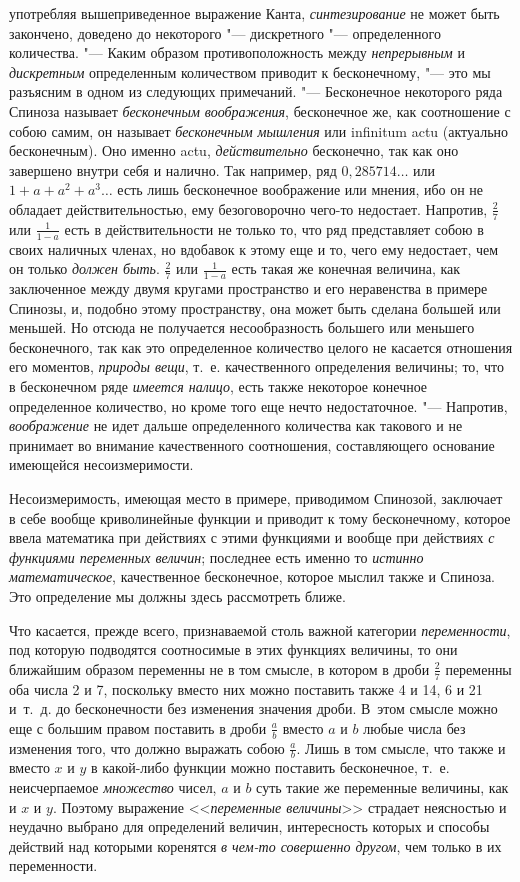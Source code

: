 употребляя вышеприведенное выражение Канта,
{\em синтезирование} не может быть закончено, доведено
до некоторого "--- дискретного "--- определенного количества. "--- Каким образом
противоположность между {\em непрерывным} и
{\em дискретным} определенным количеством приводит к
бесконечному, "--- это мы разъясним в одном из следующих примечаний. "---
Бесконечное некоторого ряда Спиноза называет
{\em бесконечным воображения}, бесконечное же, как
соотношение с собою самим, он называет {\em бесконечным
мышления} или infinitum actu (актуально бесконечным). Оно именно actu,
{\em действительно} бесконечно, так как оно завершено
внутри себя и налично. Так например, ряд
$0{,}285714\ldots$ или $1+a+a^2+a^3\ldots$
есть лишь бесконечное воображение или мнения, ибо он не обладает
действительностью, ему безоговорочно чего-то недостает. Напротив,
$\frac 2 7$ или $\frac 1{1-a}$ есть в действительности не только то,
что ряд представляет собою в своих наличных членах, но вдобавок к этому
еще и то, чего ему недостает, чем он только {\em должен быть}.
$\frac 2 7$ или $\frac 1{1-a}$
есть такая же конечная величина, как заключенное между двумя
кругами пространство и его неравенства в примере Спинозы, и, подобно этому
пространству, она может быть сделана большей или меньшей. Но отсюда не
получается несообразность большего или меньшего бесконечного, так как это
определенное количество целого не касается отношения его моментов,
{\em природы вещи}, т.~е. качественного определения
величины; то, что в бесконечном ряде {\em имеется
налицо}, есть также некоторое конечное определенное количество, но кроме
того еще нечто недостаточное. "--- Напротив,
{\em воображение} не идет дальше определенного
количества как такового и не принимает во внимание качественного
соотношения, составляющего основание имеющейся несоизмеримости.

Несоизмеримость, имеющая место в примере, приводимом Спинозой, заключает в
себе вообще криволинейные функции и приводит к тому бесконечному, которое
ввела математика при действиях с этими функциями и вообще при действиях
{\em с функциями переменных величин}; последнее есть
именно то {\em истинно математическое}, качественное
бесконечное, которое мыслил также и Спиноза. Это определение мы должны
здесь рассмотреть ближе.

Что касается, прежде всего, признаваемой столь важной категории
{\em переменности}, под которую подводятся соотносимые
в этих функциях величины, то они ближайшим образом переменны не в том
смысле, в котором в дроби $\frac 2 7$ переменны оба числа 2 и 7,
поскольку вместо них можно поставить также 4 и 14, 6 и 21 и~т.~д. до
бесконечности без изменения значения дроби. В~этом смысле можно еще с
большим правом поставить в дроби $\frac a b$ вместо
$a$ и $b$ любые числа без
изменения того, что должно выражать собою $\frac a b$.
Лишь в том смысле, что также и вместо $x$ и
$y$ в какой-либо функции можно поставить
бесконечное, т.~е. неисчерпаемое {\em множество} чисел,
$a$ и $b$ суть такие же
переменные величины, как и $x$ и
$y$. Поэтому выражение
<<{\em переменные величины}>> страдает неясностью и
неудачно выбрано для определений величин, интересность которых и способы
действий над которыми коренятся {\em в чем-то
совершенно другом}, чем только в их переменности.

